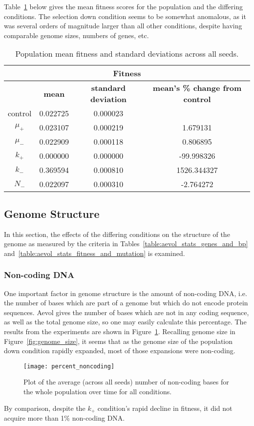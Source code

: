 Table~\ref{table:fitness_means_std_dev} below gives the mean fitness scores for the population and the differing conditions. The selection down condition seems to be somewhat anomalous, as it was several orders of magnitude larger than all other conditions, despite having comparable genome sizes, numbers of genes, etc.
\begin{table}[H]
	\centering
	\begin{tabular}{|c||c|c|c|}
		\hline
		\multicolumn{4}{c}{\Large \textbf{Fitness}} \\
		\hline
		& \textbf{mean} & \textbf{standard deviation} & \textbf{mean's \% change from control} \\
		\hline \hline
		control & 0.022725 & 0.000023 & \textemdash \\ 
		\hline
		$\mu_+$ & 0.023107 & 0.000219 & 1.679131 \\ 
		\hline
		$\mu_-$ & 0.022909 & 0.000118 & 0.806895 \\ 
		\hline
		$k_+$ & 0.000000 & 0.000000 & -99.998326 \\ 
		\hline
		$k_-$ & 0.369594 & 0.000810 & 1526.344327 \\ 
		\hline
		$N_-$ & 0.022097 & 0.000310 & -2.764272 \\ 
		\hline
	\end{tabular}
	\caption[Fitness means and standard deviations.]{Population mean fitness and standard deviations across all seeds. }
	\label{table:fitness_means_std_dev}
\end{table}

\subsection{Genome Structure}
In this section, the effects of the differing conditions on the structure of the genome as measured by the criteria in Tables~\ref{table:aevol_stats_genes_and_bp} and~\ref{table:aevol_stats_fitness_and_mutation} is examined. 

\subsubsection{Non-coding DNA}
One important factor in genome structure is the amount of non-coding DNA, i.e. the number of bases which are part of a genome but which do not encode protein sequences. Aevol gives the number of bases which are not in any coding sequence, as well as the total genome size, so one may easily calculate this percentage. The results from the experiments are shown in Figure~\ref{fig:mean_non-coding_DNA}. Recalling genome size in Figure~\ref{fig:genome_size}, it seems that as the genome size of the population down condition rapidly expanded, most of those expansions were non-coding.
\begin{figure}[H]
	\centering
	\texttt{[image: percent\_noncoding]}
	\caption[Non-coding DNA]{Plot of the average (across all seeds) number of non-coding bases for the whole population over time for all conditions.}
	\label{fig:mean_non-coding_DNA}
\end{figure}
By comparison, despite the $k_+$ condition's rapid decline in fitness, it did not acquire more than 1\% non-coding DNA. 

